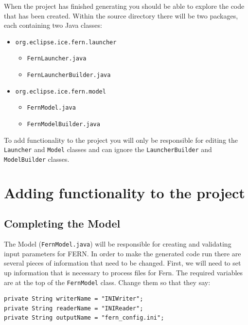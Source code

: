 \documentclass{article} \usepackage{graphicx} \usepackage{hyperref}
\begin{document}
When the project has finished generating you should be able to explore the code
that has been created.  Within the source directory there will be two packages,
each containing two Java classes:

\begin{itemize} 
    \item \texttt{org.eclipse.ice.fern.launcher} 
    \begin{itemize}
        \item \texttt{FernLauncher.java} 
        \item \texttt{FernLauncherBuilder.java}
    \end{itemize} 
    \item \texttt{org.eclipse.ice.fern.model} 
    \begin{itemize} 
        \item \texttt{FernModel.java} 
        \item \texttt{FernModelBuilder.java}
    \end{itemize} 
\end{itemize}

To add functionality to the project you will only be responsible for editing
the \texttt{Launcher} and \texttt{Model} classes and can ignore the
\texttt{LauncherBuilder} and \texttt{ModelBuilder} classes.


\section{Adding functionality to the project}

\subsection{Completing the Model}

The Model (\texttt{FernModel.java}) will be responsible for creating and
validating input parameters for FERN.  In order to make the generated code run
there are several pieces of information that need to be changed.  First, we
will need to set up information that is necessary to process files for Fern.
The required variables are at the top of the \texttt{FernModel} class.  Change
them so that they say:

\begin{lstlisting}
private String writerName = "INIWriter";
private String readerName = "INIReader";
private String outputName = "fern_config.ini";
\end{lstlisting}
\end{document}
